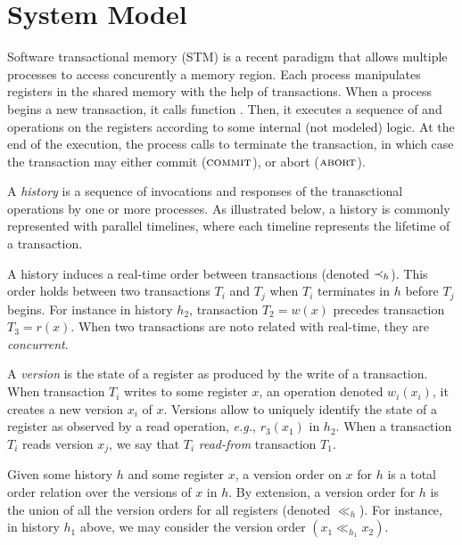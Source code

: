 %
%
\section{System Model}

Software transactional memory (STM) is a recent paradigm that allows multiple processes to access concurently a memory region.
Each process manipulates registers in the shared memory with the help of transactions.
When a process begins a new transaction, it calls function \stmBeginFunction.
Then, it executes a sequence of \stmReadFunction and \stmWriteFunction operations on the registers according to some internal (not modeled) logic.
At the end of the execution, the process calls \stmTryCommitFunction to terminate the transaction, in which case the transaction may either commit ($\text{\textsc{commit}}$), or abort ($\text{\textsc{abort}}$).

A \emph{history} is a sequence of invocations and responses of the tranasctional operations by one or more processes.
As illustrated below, a history is commonly represented with parallel timelines, where each timeline represents the lifetime of a transaction.

A history induces a real-time order between transactions (denoted $\hb_h$).
This order holds between two transactions $T_i$ and $T_j$ when $T_i$ terminates in $h$ before $T_j$ begins.
For instance in history $h_2$, transaction $T_2=w(x)$ precedes transaction $T_3=r(x)$.
When two transactions are noto related with real-time, they are \emph{concurrent}.

A \emph{version} is the state of a register as produced by the write of a transaction.
When transaction $T_i$ writes to some register $x$, an operation denoted $w_i(x_i)$, it creates a new version $x_i$ of $x$.
Versions allow to uniquely identify the state of a register as observed by a read operation, \emph{e.g.}, $r_3(x_1)$ in $h_2$.
When a transaction $T_i$ reads version $x_j$, we say that $T_i$ \emph{read-from} transaction $T_1$.

Given some history $h$ and some register $x$, a version order on $x$ for $h$ is a total order relation over the versions of $x$ in $h$.
By extension, a version order for $h$ is the union of all the version orders for all registers (denoted $\ll_h$).
For instance, in history $h_1$ above,  we may consider the version order $(x_1 \ll_{h_1} x_2)$.


